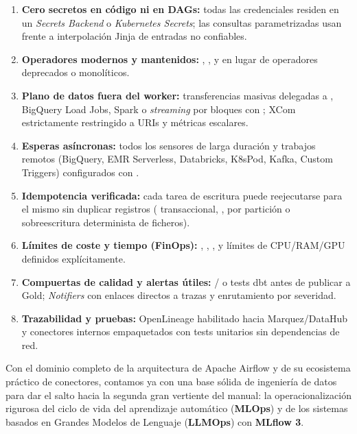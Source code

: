 \begin{infobox}
\begin{enumerate}
  \item \textbf{Cero secretos en código ni en DAGs:} todas las credenciales residen en un \textit{Secrets Backend} o \textit{Kubernetes Secrets}; las consultas parametrizadas usan  frente a interpolación Jinja de entradas no confiables.
  \item \textbf{Operadores modernos y mantenidos:} , ,  y  en lugar de operadores deprecados o monolíticos.
  \item \textbf{Plano de datos fuera del worker:} transferencias masivas delegadas a , BigQuery Load Jobs, Spark o \textit{streaming} por bloques con ; XCom estrictamente restringido a URIs y métricas escalares.
  \item \textbf{Esperas asíncronas:} todos los sensores de larga duración y trabajos remotos (BigQuery, EMR Serverless, Databricks, K8sPod, Kafka, Custom Triggers) configurados con .
  \item \textbf{Idempotencia verificada:} cada tarea de escritura puede reejecutarse para el mismo  sin duplicar registros ( transaccional, ,  por partición o sobreescritura determinista de ficheros).
  \item \textbf{Límites de coste y tiempo (FinOps):} , , ,  y límites de CPU/RAM/GPU definidos explícitamente.
  \item \textbf{Compuertas de calidad y alertas útiles:} / o tests dbt antes de publicar a Gold; \textit{Notifiers} con enlaces directos a trazas y enrutamiento por severidad.
  \item \textbf{Trazabilidad y pruebas:} OpenLineage habilitado hacia Marquez/DataHub y conectores internos empaquetados con tests unitarios  sin dependencias de red.
\end{enumerate}
\end{infobox}

Con el dominio completo de la arquitectura de Apache Airflow y de su ecosistema práctico de conectores, contamos ya con una base sólida de ingeniería de datos para dar el salto hacia la segunda gran vertiente del manual: la operacionalización rigurosa del ciclo de vida del aprendizaje automático (\textbf{MLOps}) y de los sistemas basados en Grandes Modelos de Lenguaje (\textbf{LLMOps}) con \textbf{MLflow 3}.
